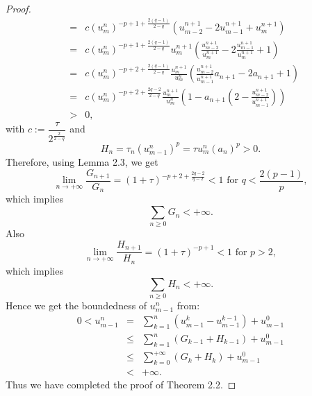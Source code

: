 \documentclass[a4paper,12pt,english,reqno]{smfart}
\begin{document}
\begin{proof}
\begin{eqnarray*}
			&=&c(u_{m}^{n})^{-p+1+\frac{2(q-1)}{2-q}}(u_{m-2}^{n+1}-2u_{m-1}^{n+1}+u_{m}^{n+1})\\
			&=&c(u_{m}^{n})^{-p+1+\frac{2(q-1)}{2-q}}u_{m}^{n+1}(\frac{u_{m-2}^{n+1}}{u_{m}^{n+1}}-2\frac{u_{m-1}^{n+1}}{u_{m}^{n+1}}+1)\\
			&=& c(u_{m}^{n})^{-p+2+\frac{2(q-1)}{2-q}}\frac{u_{m}^{n+1}}{u_{m}^{n}}(\frac{u_{m-2}^{n+1}}{u_{m-1}^{n+1}}a_{n+1}-2a_{n+1}+1)\\
			&=&c(u_{m}^{n})^{-p+2+\frac{2q-2}{2-q}}\frac{u_{m}^{n+1}}{u_{m}^{n}}(1-a_{n+1}(2-\frac{u_{m-2}^{n+1}}{u_{m-1}^{n+1}}))\\
			& >&0,
		\end{eqnarray*}
		with $c:=\dfrac{\tau}{2^{\frac{2}{2-q}}}$
		and 
		\begin{equation*}
		H_{n}=\tau_{n}(u_{m-1}^{n})^{p}=\tau u_{m}^{n}(a_{n})^{p}>0.
		\end{equation*}
		Therefore, using Lemma 2.3, we get
		\begin{equation*}
		\lim_{n\rightarrow +\infty}\dfrac{G_{n+1}}{G_{n}} =\left(1+\tau\right)^{-p+2+\frac{2q-2}{q-2}}<1 \text{ for } q<\dfrac{2(p-1)}{p},
		\end{equation*}
		which implies
		\begin{equation*}
		\sum_{n\geq0}{G_{n}}<+\infty.
		\end{equation*} 
		Also 
		\begin{equation*}
		\lim_{n\rightarrow +\infty}\frac{H_{n+1}}{H_{n}} =(1+\tau)^{-p+1}<1 \text{ for } p>2,
		\end{equation*}
		which implies
		\begin{equation*}
		\sum_{n\geq0}{H_{n}}<+\infty.
		\end{equation*} 
		Hence we get the boundedness of $u_{m-1}^{n}$ from:
		\begin{eqnarray*}
			0<u_{m-1}^{n}&=& \sum_{k=1}^{n}{(u_{m-1}^{k}-u_{m-1}^{k-1})}+u_{m-1}^{0} \\
			& \leq & \sum_{k=1}^{n}{(G_{k-1}+H_{k-1})}+u_{m-1}^{0} \\
			& \leq & \sum_{k=0}^{+\infty}{(G_{k}+H_{k})}+u_{m-1}^{0} \\
			& < & +\infty.
		\end{eqnarray*}
		Thus we have completed the proof of Theorem 2.2.
	\end{proof}
\end{document}
